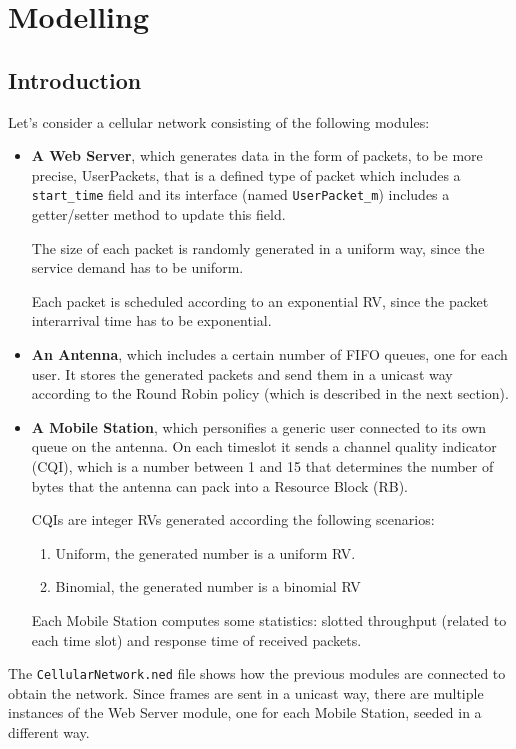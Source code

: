 \chapter{Modelling}
\section{Introduction}
Let's consider a cellular network consisting of the following modules:
\begin{itemize}
   \item \textbf{A Web Server}, which generates data in the form of packets, to be more precise, UserPackets, that is a defined type of packet which includes a \texttt{start\_time} field and its interface (named \texttt{UserPacket\_m}) includes a getter/setter method to update this field.
   
   The size of each packet is randomly generated in a uniform way, since the service demand has to be uniform.
   
   Each packet is scheduled according to an exponential RV, since the packet interarrival time has to be exponential.
   \item \textbf{An Antenna}, which includes a certain number of FIFO queues, one for each user. It stores the generated packets and send them in a unicast way according to the Round Robin policy (which is described in the next section). 
   \item \textbf{A Mobile Station}, which personifies a generic user connected to its own queue on the antenna. On each timeslot it sends a channel quality indicator (CQI), which is a number between 1 and 15 that determines the number of bytes that the antenna can pack into a Resource Block (RB).
   
   CQIs are integer RVs generated according the following scenarios:
   
   \begin{enumerate} 
    \item Uniform, the generated number is a uniform RV.
    \item Binomial, the generated number is a binomial RV
    \end{enumerate}
    
    Each Mobile Station computes some statistics: slotted throughput (related to each time slot) and response time of received packets.
\end{itemize}

\noindent The \texttt{CellularNetwork.ned} file shows how the previous modules are connected to obtain the network. 
Since frames are sent in a unicast way, there are multiple instances of the Web Server module, one for each Mobile Station, seeded in a different way.

